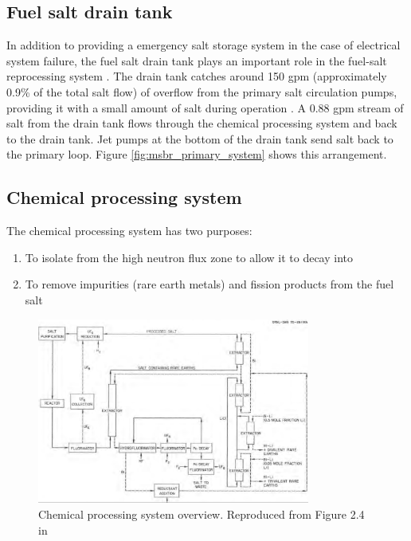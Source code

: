 \subsection{Fuel salt drain tank}
In addition to providing a emergency salt storage system in the case of
electrical system failure, the fuel salt drain tank plays an important role in
the fuel-salt reprocessing system \cite{robertson_conceptual_1971}. The drain tank catches around 150 gpm (approximately 0.9\% of the total salt flow) of
overflow from the primary salt circulation pumps, providing it with a small
amount of salt during operation \cite{robertson_conceptual_1971}. A 0.88 gpm
stream of salt from the drain tank flows through the chemical processing system
and back to the drain tank. Jet pumps at the bottom of the drain tank send salt
back to the primary loop. Figure \ref{fig:msbr_primary_system} shows this
arrangement.

\subsection{Chemical processing system}
The chemical processing system has two purposes:
\begin{enumerate}
    \item To isolate  from the high neutron flux zone to allow it to decay into 
    \item To remove impurities (rare earth metals) and fission products from the fuel salt
\end{enumerate}

\begin{figure}[htpb]
    \centering
    \includegraphics[width=0.8\textwidth]{figs/ch4/chemical_processing_system.png}
    \caption{Chemical processing system overview. Reproduced from Figure 2.4 in \cite{robertson_conceptual_1971}}
    \label{fig:}
\end{figure}

